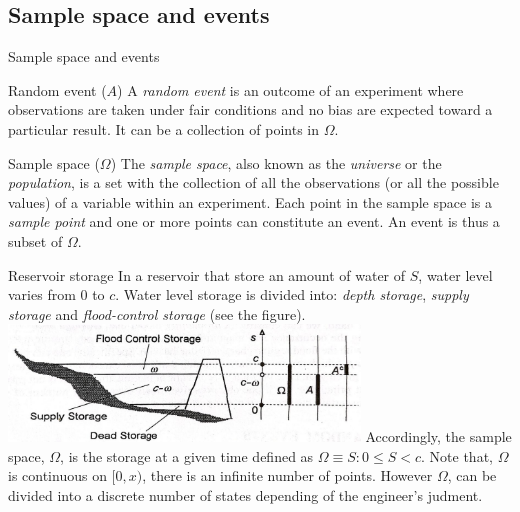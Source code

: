 \documentclass[8pt]{beamer}
\begin{document}
\subsection{Sample space and events}
\begin{frame}{Sample space and events}
    \begin{block}{Random event ($A$)}
        A \emph{random event} is an outcome of an experiment where observations are taken under fair conditions and no bias are expected toward a particular result. It can be a collection of points in $\Omega$.
    \end{block}
    \begin{block}{Sample space ($\Omega$)}
        The \emph{sample space}, also known as the \emph{universe} or the \emph{population}, is a set with the collection of all the observations (or all the possible values) of a variable within an experiment. Each point in the sample space is a \emph{sample point} and one or more points can constitute an event. An event is thus a subset of $\Omega$.  
    \end{block}
    \begin{exampleblock}{Reservoir storage}
    In a reservoir that store an amount of water of $S$, water level varies from 0 to $c$. Water level storage is divided into: \emph{depth storage}, \emph{supply storage} and \emph{flood-control storage} (see the figure).
    \includegraphics[width=0.7\textwidth]{fi211.jpeg}
    Accordingly, the sample space, $\Omega$, is the storage at a given time defined as $\Omega \equiv {S: 0 \leq S < c}$. Note that, $\Omega$ is continuous on $[0,x)$, there is an infinite number of points. However $\Omega$, can be divided into a discrete number of states depending of the engineer's judment. 
    \end{exampleblock}
        
\end{frame}
\end{document}
